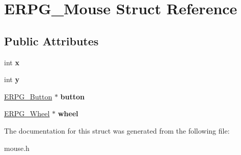 \hypertarget{structERPG__Mouse}{\section{E\-R\-P\-G\-\_\-\-Mouse Struct Reference}
\label{structERPG__Mouse}
}
\subsection*{Public Attributes}
\begin{DoxyCompactItemize}
\item 
\hypertarget{structERPG__Mouse_a2e9ae060c8dea6e55d011f53c8779ed9}{int {\bfseries x}}\label{structERPG__Mouse_a2e9ae060c8dea6e55d011f53c8779ed9}

\item 
\hypertarget{structERPG__Mouse_ab33f2fff8a9316c1035bd84b4c8c0dee}{int {\bfseries y}}\label{structERPG__Mouse_ab33f2fff8a9316c1035bd84b4c8c0dee}

\item 
\hypertarget{structERPG__Mouse_a2d3288b3d04c8027322efd4f8b98f7c7}{\hyperlink{structERPG__Button}{E\-R\-P\-G\-\_\-\-Button} $\ast$ {\bfseries button}}\label{structERPG__Mouse_a2d3288b3d04c8027322efd4f8b98f7c7}

\item 
\hypertarget{structERPG__Mouse_aefeb7d967fc7a23a374b16e67eb17b4f}{\hyperlink{structERPG__Wheel}{E\-R\-P\-G\-\_\-\-Wheel} $\ast$ {\bfseries wheel}}\label{structERPG__Mouse_aefeb7d967fc7a23a374b16e67eb17b4f}

\end{DoxyCompactItemize}


The documentation for this struct was generated from the following file\-:\begin{DoxyCompactItemize}
\item 
mouse.\-h\end{DoxyCompactItemize}
